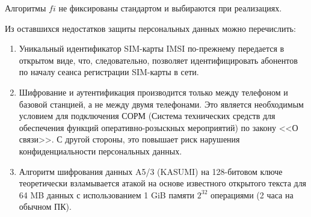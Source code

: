 Алгоритмы $fi$ не фиксированы стандартом и выбираются при реализациях.

Из оставшихся недостатков защиты персональных данных можно перечислить:
\begin{enumerate}
    \item Уникальный идентификатор SIM-карты IMSI по-прежнему передается в открытом виде, что, следовательно, позволяет идентифицировать абонентов по началу сеанса регистрации SIM-карты в сети.
    \item Шифрование и аутентификация производится только между телефоном и базовой станцией, а не между двумя телефонами. Это является необходимым условием для подключения СОРМ (Система технических средств для обеспечения функций оперативно-розыскных мероприятий) по закону <<О связи>>. С другой стороны, это  повышает риск нарушения конфиденциальности персональных данных.
    \item Алгоритм шифрования данных A5/3 (KASUMI) на 128-битовом ключе теоретически взламывается атакой на основе известного открытого текста для 64 MB данных с использованием 1 GiB памяти $2^{32}$ операциями (2 часа на обычном ПК).
\end{enumerate}
